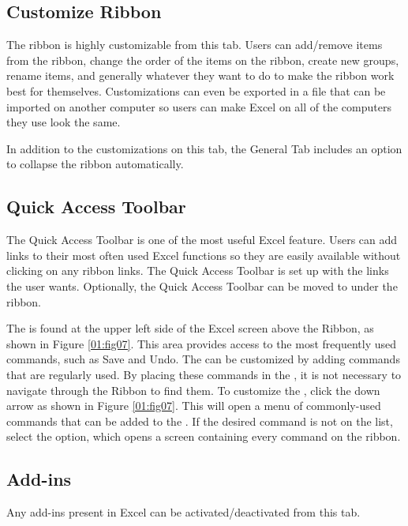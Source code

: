 \subsection{Customize Ribbon}

The ribbon is highly customizable from this tab. Users can add/remove items from the ribbon, change the order of the items on the ribbon, create new groups, rename items, and generally whatever they want to do to make the ribbon work best for themselves. Customizations can even be exported in a file that can be imported on another computer so users can make Excel on all of the computers they use look the same.

In addition to the customizations on this tab, the General Tab includes an option to collapse the ribbon automatically.

\subsection{Quick Access Toolbar}

The Quick Access Toolbar is one of the most useful Excel feature. Users can add links to their most often used Excel functions so they are easily available without clicking on any ribbon links. The Quick Access Toolbar is set up with the links the user wants. Optionally, the Quick Access Toolbar can be moved to under the ribbon.

The  is found at the upper left side of the Excel screen above the Ribbon, as shown in Figure \ref{01:fig07}. This area provides access to the most frequently used commands, such as Save and Undo. The  can be customized by adding commands that are regularly used. By placing these commands in the , it is not necessary to navigate through the Ribbon to find them. To customize the , click the down arrow as shown in Figure \ref{01:fig07}. This will open a menu of commonly-used commands that can be added to the . If the desired command is not on the list, select the  option, which opens a screen containing every command on the ribbon.


\subsection{Add-ins}

Any add-ins present in Excel can be activated/deactivated from this tab.

